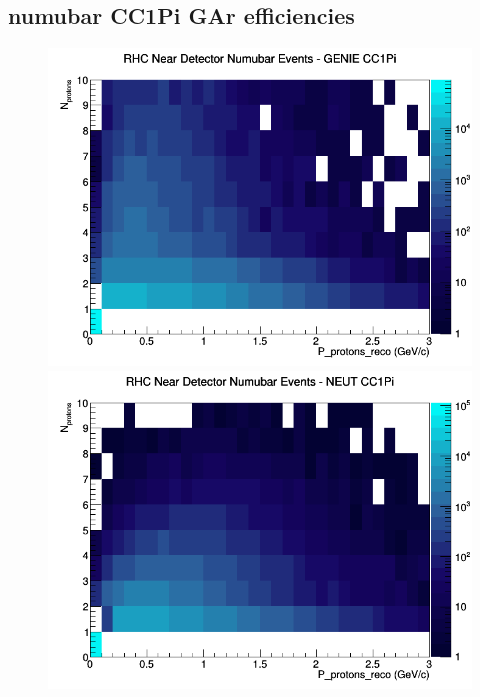 \documentclass[12pt]{article}
\begin{document}
\subsection{numubar CC1Pi GAr efficiencies}
\begin{figure}[h]
\includegraphics[width=\linewidth]{eff_N_P/GAr/protons/CC1Pi_RHC_ND_numubar_N_P_GENIE.png}
\endminipage
{}
\includegraphics[width=\linewidth]{eff_N_P/GAr/protons/CC1Pi_RHC_ND_numubar_N_P_NEUT.png}
\endminipage
{}

\end{figure}
\end{document}
